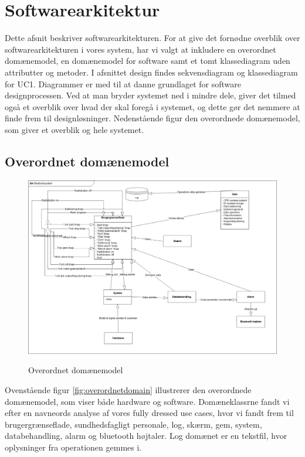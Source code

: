 \section{Softwarearkitektur}
Dette afsnit beskriver softwarearkitekturen. For at give det fornødne overblik over softwarearkitekturen i vores system, har vi valgt at inkludere en overordnet domænemodel, en domænemodel for software samt et tomt klassediagram uden attributter og metoder. I afsnittet design findes sekvensdiagram og klassediagram for UC1. Diagrammer er med til at danne grundlaget for software designprocessen. Ved at man bryder systemet ned i mindre dele, giver det tilmed også et overblik over hvad der skal foregå i systemet, og dette gør det nemmere at finde frem til designløsninger. Nedenstående figur den overordnede domænemodel, som giver et overblik og hele systemet. 

\subsection{Overordnet domænemodel}
	\begin{figure}[h!]
	\centering
	\includegraphics[width=1\linewidth]{Arkitektur_og_design/Softwarearkitektur/overordnetdomain}
	\label{fig:overordnetdomain}
	\caption{Overordnet domænemodel}
\end{figure}

Ovenstående figur \vref{fig:overordnetdomain} illustrerer den overordnede domænemodel, som viser både hardware og software. Domæneklassrne fandt vi efter en navneords analyse af vores fully dressed use cases, hvor vi fandt frem til brugergrænseflade, sundhedsfagligt personale, log, skærm, gem, system, databehandling, alarm og bluetooth højtaler.  Log domænet er en tekstfil, hvor oplysninger fra operationen gemmes i.

